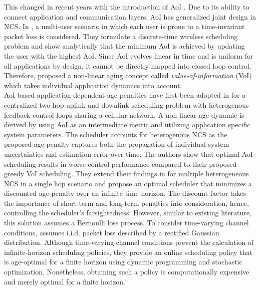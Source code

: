 This changed in recent years with the introduction of AoI \cite{kaul2012real}.
Due to its ability to connect application and communication layers, AoI has
generalized joint design in NCS. In \cite{kadota2018scheduling}, a multi-user
scenario in which each user is prone to a time-invariant packet loss is
considered. They formulate a discrete-time wireless scheduling problem and show
analytically that the minimum AoI is achieved by updating the user with the
highest AoI. Since AoI evolves linear in time and is uniform for all
applications by design, it cannot be directly mapped into closed loop control.
Therefore, \cite{kosta2017age} proposed a non-linear aging concept called
\textit{value-of-information} (VoI) which takes individual application dynamics
into account. \\
AoI based application-dependent age penalties have first been adopted in
\cite{ayan2019age} for a centralized two-hop uplink and downlink scheduling
problem with heterogenous feedback control loops sharing a cellular network. A
non-linear age dynamic is derived by using AoI as an intermediate metric and
utilizing application specific system parameters. The scheduler accounts for
heterogenous NCS as the proposed age-penalty captures both the propagation of
individual system uncertainties and estimation error over time. The authors show
that optimal AoI scheduling results in worse control performance compared to
their proposed greedy VoI scheduling. They extend their findings in
\cite{ayan2020optimal} for multiple heterogeneous NCS in a single hop scenario
and propose an optimal scheduler that minimizes a discounted age-penalty over an
infinite time horizon. The discount factor takes the importance of short-term
and long-term penalties into consideration, hence, controlling the scheduler's
farsightedness. However, similar to existing literature, this solution assumes a
Bernoulli loss process. To consider time-varying channel conditions,
\cite{ayan2020aoi} assumes i.i.d. packet loss described by a rectified Gaussian
distribution. Although time-varying channel conditions prevent the calculation
of infinite-horizon scheduling policies, they provide an online scheduling
policy that is age-optimal for a finite horizon using dynamic programming and
stochastic optimization. Nonetheless, obtaining such a policy is computationally
expensive and merely optimal for a finite horizon.

